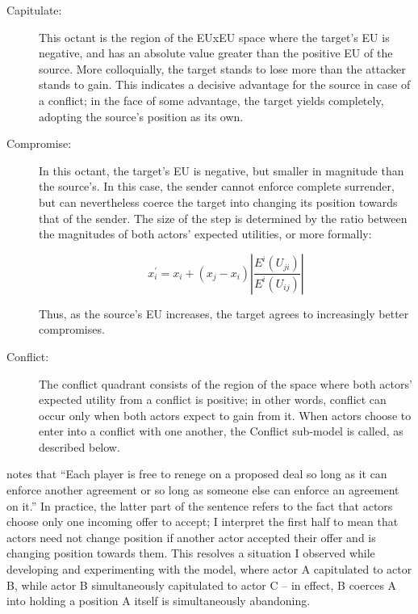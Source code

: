 \begin{description}
    \item[Capitulate:] This octant is the region of the EUxEU space where the target's EU is negative, and has an absolute value greater than the positive EU of the source. More colloquially, the target stands to lose more than the attacker stands to gain. This indicates a decisive advantage for the source in case of a conflict; in the face of some advantage, the target yields completely, adopting the source's position as its own. 

    \item[Compromise:] In this octant, the target's EU is negative, but smaller in magnitude than the source's. In this case, the sender cannot enforce complete surrender, but can nevertheless coerce the target into changing its position towards that of the sender. The size of the step is determined by the ratio between the magnitudes of both actors' expected utilities, or more formally:
    
    \begin{equation}
        x_i^\prime = x_i + (x_j - x_i)\left\lvert\frac{E^i(U_{ji})}{E^i(U_{ij})}\right\rvert
    \end{equation}

    Thus, as the source's EU increases, the target agrees to increasingly better compromises.

    \item[Conflict:] The conflict quadrant consists of the region of the space where both actors' expected utility from a conflict is positive; in other words, conflict can occur only when both actors expect to gain from it. When actors choose to enter into a conflict with one another, the Conflict sub-model is called, as described below.

\end{description}

\citet{bdm_2002} notes that ``Each player is free to renege on a proposed deal so long as it can enforce another agreement or so long as someone else can enforce an agreement on it.'' In practice, the latter part of the sentence refers to the fact that actors choose only one incoming offer to accept; I interpret the first half to mean that actors need not change position if another actor accepted their offer and is changing position towards them. This resolves a situation I observed while developing and experimenting with the model, where actor A capitulated to actor B, while actor B simultaneously capitulated to actor C -- in effect, B coerces A into holding a position A itself is simultaneously abandoning.


